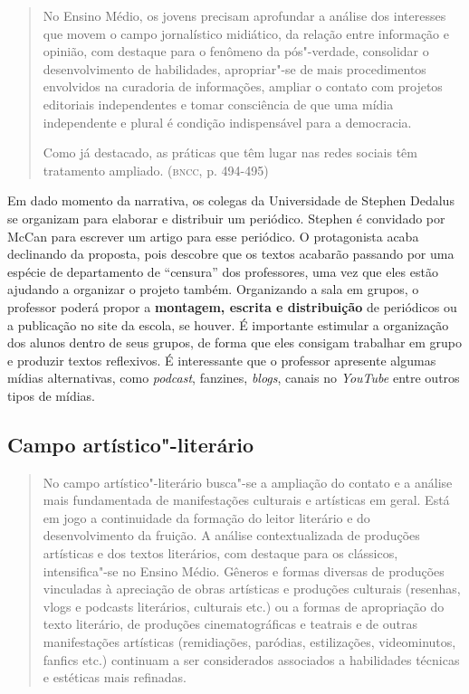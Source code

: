 \documentclass[12pt]{extarticle}
\begin{document}
{\begin{quote}
No Ensino Médio, os jovens precisam aprofundar a análise dos interesses
que movem o campo jornalístico midiático, da relação entre informação e
opinião, com destaque para o fenômeno da pós"-verdade, consolidar o
desenvolvimento de habilidades, apropriar"-se de mais procedimentos
envolvidos na curadoria de informações, ampliar o contato com projetos
editoriais independentes e tomar consciência de que uma mídia
independente e plural é condição indispensável para a democracia.

Como já destacado, as práticas que têm lugar nas redes sociais têm
tratamento ampliado. (\textsc{bncc}, p. 494-495)
\end{quote}

Em dado momento da narrativa, os colegas da Universidade de Stephen
Dedalus se organizam para elaborar e distribuir um periódico. Stephen
é convidado por McCan para escrever um artigo para esse periódico. O
protagonista acaba declinando da proposta, pois descobre que os textos
acabarão passando por uma espécie de departamento de ``censura'' dos
professores, uma vez que eles estão ajudando a organizar o projeto
também. Organizando a sala em grupos, o professor poderá propor a
\textbf{montagem, escrita e distribuição} de periódicos ou a
publicação no site da escola, se houver. É importante estimular a
organização dos alunos dentro de seus grupos, de forma que eles
consigam trabalhar em grupo e produzir textos reflexivos. É
interessante que o professor apresente algumas mídias alternativas,
como \emph{podcast}, fanzines, \emph{blogs}, canais no \emph{YouTube}
entre outros tipos de mídias.

\subsection{Campo artístico"-literário}

\begin{quote}
No campo artístico"-literário busca"-se a ampliação do contato e a
análise mais fundamentada de manifestações culturais e artísticas em
geral. Está em jogo a continuidade da formação do leitor literário e do
desenvolvimento da fruição. A análise contextualizada de produções
artísticas e dos textos literários, com destaque para os clássicos,
intensifica"-se no Ensino Médio. Gêneros e formas diversas de produções
vinculadas à apreciação de obras artísticas e produções culturais
(resenhas, vlogs e podcasts literários, culturais etc.) ou a formas de
apropriação do texto literário, de produções cinematográficas e teatrais
e de outras manifestações artísticas (remidiações, paródias,
estilizações, videominutos, fanfics etc.) continuam a ser considerados
associados a habilidades técnicas e estéticas mais refinadas.


\end{quote}}
\end{document}
